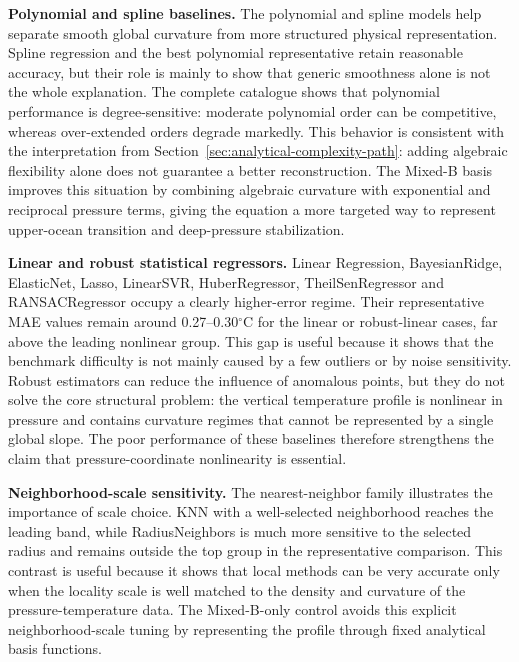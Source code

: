 \documentclass[10pt]{article}
\begin{document}
\vspace{0.25em}
\noindent\textbf{Polynomial and spline baselines.}
The polynomial and spline models help separate smooth global curvature from more structured physical representation.
Spline regression and the best polynomial representative retain reasonable accuracy, but their role is mainly to show that generic smoothness alone is not the whole explanation.
The complete catalogue shows that polynomial performance is degree-sensitive: moderate polynomial order can be competitive, whereas over-extended orders degrade markedly.
This behavior is consistent with the interpretation from Section~\ref{sec:analytical-complexity-path}: adding algebraic flexibility alone does not guarantee a better reconstruction.
The Mixed-B basis improves this situation by combining algebraic curvature with exponential and reciprocal pressure terms, giving the equation a more targeted way to represent upper-ocean transition and deep-pressure stabilization.

\vspace{0.25em}
\noindent\textbf{Linear and robust statistical regressors.}
Linear Regression, BayesianRidge, ElasticNet, Lasso, LinearSVR, HuberRegressor, TheilSenRegressor and RANSACRegressor occupy a clearly higher-error regime.
Their representative MAE values remain around 0.27--0.30$^\circ$C for the linear or robust-linear cases, far above the leading nonlinear group.
This gap is useful because it shows that the benchmark difficulty is not mainly caused by a few outliers or by noise sensitivity.
Robust estimators can reduce the influence of anomalous points, but they do not solve the core structural problem: the vertical temperature profile is nonlinear in pressure and contains curvature regimes that cannot be represented by a single global slope.
The poor performance of these baselines therefore strengthens the claim that pressure-coordinate nonlinearity is essential.

\vspace{0.25em}
\noindent\textbf{Neighborhood-scale sensitivity.}
The nearest-neighbor family illustrates the importance of scale choice.
KNN with a well-selected neighborhood reaches the leading band, while RadiusNeighbors is much more sensitive to the selected radius and remains outside the top group in the representative comparison.
This contrast is useful because it shows that local methods can be very accurate only when the locality scale is well matched to the density and curvature of the pressure-temperature data.
The Mixed-B-only control avoids this explicit neighborhood-scale tuning by representing the profile through fixed analytical basis functions.
\end{document}
